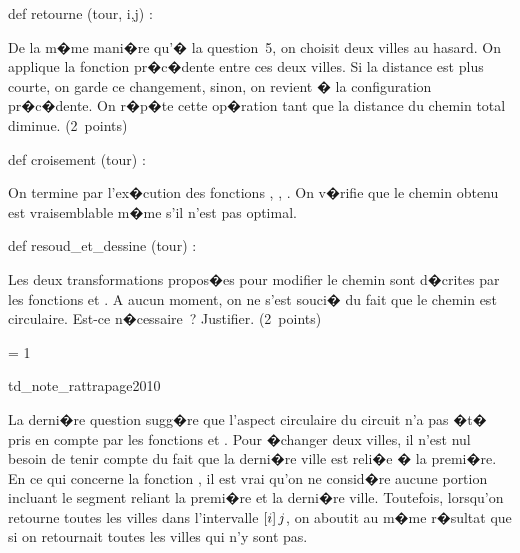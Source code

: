 \begin{xexercicenot}
\begin{verbatimx}
def retourne (tour, i,j) :
\end{verbatimx}
        

\exequest De la m�me mani�re qu'� la question~5, on choisit deux villes au hasard. On applique la fonction pr�c�dente entre ces deux villes. Si la distance est plus courte, on garde ce changement, sinon, on revient � la configuration pr�c�dente. On r�p�te cette op�ration tant que la distance du chemin total diminue.  (2~points)

\begin{verbatimx}
def croisement (tour) :
\end{verbatimx}
        
\exequest On termine par l'ex�cution des fonctions , , . On v�rifie que le chemin obtenu est vraisemblable m�me s'il n'est pas optimal. 

\begin{verbatimx}
def resoud_et_dessine (tour) :
\end{verbatimx}

Les deux transformations propos�es pour modifier le chemin sont d�crites par les fonctions  et . A aucun moment, on ne s'est souci� du fait que le chemin est circulaire. Est-ce n�cessaire~? Justifier. (2~points)

\end{xexercicenot}




\ifnum\correctionenonce = 1

\begin{xdemoexonot}{td_note_rattrapage2010}

La derni�re question sugg�re que l'aspect circulaire du circuit n'a pas �t� pris en compte par les fonctions  et . Pour �changer deux villes, il n'est nul besoin de tenir compte du fait que la derni�re ville est reli�e � la premi�re. En ce qui concerne la fonction , il est vrai qu'on ne consid�re aucune portion incluant le segment reliant la premi�re et la derni�re ville. Toutefois, lorsqu'on retourne toutes les villes dans l'intervalle $\left[i\right]{j}$, on aboutit au m�me r�sultat que si on retournait toutes les villes qui n'y sont pas.

\bigskip
{}

\end{xdemoexonot}
\fi

%
